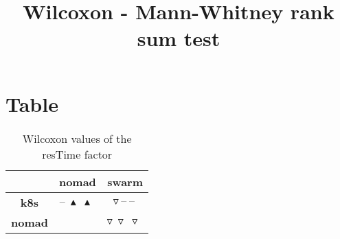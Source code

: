 \documentclass{article}
\title{Wilcoxon - Mann-Whitney rank sum test}
\author{}
\begin{document}
\maketitle
\section{Table}
\begin{table}[!htp]
  \caption{Wilcoxon values of the resTime factor}
  \label{table:resTime}
  \centering
  \begin{scriptsize}
  \begin{tabular}{c|cc}
      & \textbf{nomad} & \textbf{swarm} \\\hline
      \textbf{k8s} & $\text{--}\ \blacktriangle\ \blacktriangle\  $ & $ \triangledown\ \text{--}\ \text{--}\ $ \\
      \textbf{nomad} & $ $ & $ \triangledown\ \triangledown\ \triangledown\ $ \\
  \end{tabular}
  \end{scriptsize}
\end{table}
\end{document}
